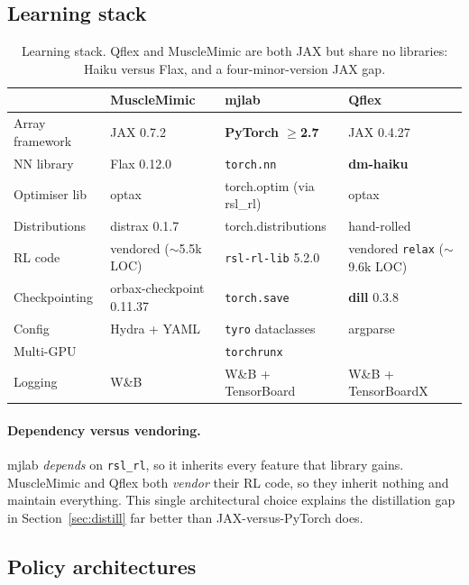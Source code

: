 \documentclass[11pt,a4paper]{article}
\newcommand{\na}{\textemdash}
\begin{document}
\subsection{Learning stack}

\begin{table}[h!]
\centering
\footnotesize
\begin{tabular}{@{}lL{3.1cm}L{3.1cm}L{3.4cm}@{}}
\toprule
 & \textcolor{mmC}{MuscleMimic} & \textcolor{mjC}{mjlab} & \textcolor{qfC}{Qflex} \\
\midrule
Array framework & JAX 0.7.2 & \textbf{PyTorch $\ge$2.7} & JAX 0.4.27 \\
NN library & Flax 0.12.0 & \texttt{torch.nn} & \textbf{dm-haiku} \\
Optimiser lib & optax & torch.optim (via rsl\_rl) & optax \\
Distributions & distrax 0.1.7 & torch.distributions & hand-rolled \\
RL code & vendored ($\sim$5.5k LOC) & \texttt{rsl-rl-lib} 5.2.0 & vendored \texttt{relax} ($\sim$9.6k LOC) \\
Checkpointing & orbax-checkpoint 0.11.37 & \texttt{torch.save} & \textbf{dill} 0.3.8 \\
Config & Hydra + YAML & \texttt{tyro} dataclasses & argparse \\
Multi-GPU & \na & \texttt{torchrunx} & \na \\
Logging & W\&B & W\&B + TensorBoard & W\&B + TensorBoardX \\
\bottomrule
\end{tabular}
\caption{Learning stack. Qflex and MuscleMimic are both JAX but share no libraries:
Haiku versus Flax, and a four-minor-version JAX gap.}
\end{table}

\paragraph{Dependency versus vendoring.}
mjlab \emph{depends} on \texttt{rsl\_rl}, so it inherits every feature that library gains.
MuscleMimic and Qflex both \emph{vendor} their RL code, so they inherit nothing and
maintain everything. This single architectural choice explains the distillation gap in
Section~\ref{sec:distill} far better than JAX-versus-PyTorch does.

\subsection{Policy architectures}
\end{document}
